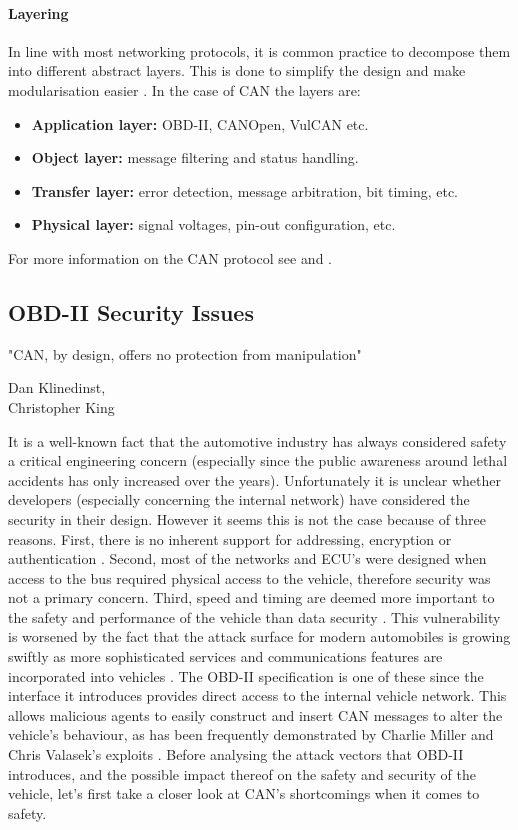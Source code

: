 \documentclass[master=cws,masteroption=vs,english]{kulemt}
\begin{document}
\paragraph{Layering}

In line with most networking protocols, it is common practice to decompose them into different abstract layers. This is done to simplify the design and make modularisation easier \cite{wiki:ProtocolStack}. In the case of CAN the layers are:

\begin{itemize}
	\item \textbf{Application layer:} OBD-II, CANOpen, VulCAN etc.
	\item \textbf{Object layer:} message filtering and status handling.
	\item \textbf{Transfer layer:} error detection, message arbitration, bit timing, etc.
	\item \textbf{Physical layer:} signal voltages, pin-out configuration, etc.
\end{itemize}

For more information on the CAN protocol see \cite{ISO11898-2} and \cite{ISO11898-3}.

\subsection{OBD-II Security Issues}
\label{sec:issues}

\epigraph{"CAN, by design, offers no protection from manipulation"}{Dan Klinedinst, \\ Christopher King}

It is a well-known fact that the automotive industry has always considered safety a critical engineering concern (especially since the public awareness around lethal accidents has only increased over the years). Unfortunately it is unclear whether developers (especially concerning the internal network) have considered the security in their design. However it seems this is not the case because of three reasons. First, there is no inherent support for addressing, encryption or authentication \cite{MillerB}. Second, most of the networks and ECU's were designed when access to the bus required physical access to the vehicle, therefore security was not a primary concern. Third, speed and timing are deemed more important to the safety and performance of the vehicle than data security \cite{Klinedinst05}. This vulnerability is worsened by the fact that the attack surface for modern automobiles is growing swiftly as more sophisticated services and communications features are incorporated into vehicles \cite{Kosher}. The OBD-II specification is one of these since the interface it introduces provides direct access to the internal vehicle network. This allows malicious agents to easily construct and insert CAN messages to alter the vehicle's behaviour, as has been frequently demonstrated by Charlie Miller and Chris Valasek's exploits \cite{MillerA}\cite{MillerB}\cite{MillerC}. Before analysing the attack vectors that OBD-II introduces, and the possible impact thereof on the safety and security of the vehicle, let's first take a closer look at CAN's shortcomings when it comes to safety.
\end{document}
